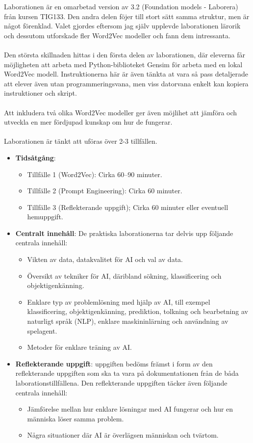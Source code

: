 \documentclass[a4paper, 12pt]{article}
\begin{document}
Laborationen är en omarbetad version av 3.2 (Foundation models - Laborera) från kursen TIG133. Den andra delen föjer till stort sätt samma struktur, men är något förenklad. Valet gjordes eftersom jag själv upplevde laborationen lärorik och dessutom utforskade fler Word2Vec modeller och fann dem intressanta.
\\ \\
Den största skillnaden hittas i den första delen av laborationen, där eleverna får möjligheten att arbeta med Python-biblioteket Gensim för arbeta med en lokal Word2Vec modell. Instruktionerna här är även tänkta at vara så pass detaljerade att elever även utan programmeringsvana, men viss datorvana enkelt kan kopiera instruktioner och skript.
\\ \\
Att inkludera två olika Word2Vec modeller ger även möjlihet att jämföra och utveckla en mer fördjupad kunskap om hur de fungerar.
\\ \\
Laborationen är tänkt att uföras över 2-3 tillfällen.
\begin{itemize}
\item \textbf{Tidsåtgång}:
\begin{itemize}
    \item Tillfälle 1 (Word2Vec): Cirka 60–90 minuter.
    \item Tillfälle 2 (Prompt Engineering): Cirka 60 minuter.
    \item Tillfälle 3 (Reflekterande uppgift); Cirka 60 minuter eller eventuell hemuppgift.
\end{itemize}

\item \textbf{Centralt innehåll}: De praktiska laborationerna tar delvis upp följande centrala innehåll:
\begin{itemize}
    \item Vikten av data, datakvalitet för AI och val av data.
    \item Översikt av tekniker för AI, däribland sökning, klassificering och objektigenkänning.
    \item Enklare typ av problemlösning med hjälp av AI, till exempel klassificering, objektigenkänning, prediktion, tolkning och bearbetning av naturligt språk (NLP), enklare maskininlärning och användning av spelagent.
    \item Metoder för enklare träning av AI.
\end{itemize}
\item \textbf{Reflekterande uppgift}: uppgiften bedöms frămst i form av den reflekterande uppgiften som ska ta vara på dokumentationen från de båda laborationstillfällena. Den reflekterande uppgiften täcker även följande centrala innehåll:
\begin{itemize}
    \item Jämförelse mellan hur enklare lösningar med AI fungerar och hur en människa löser samma problem.
    \item Några situationer där AI är överlägsen människan och tvärtom.
\end{itemize}
\end{itemize}
\end{document}
